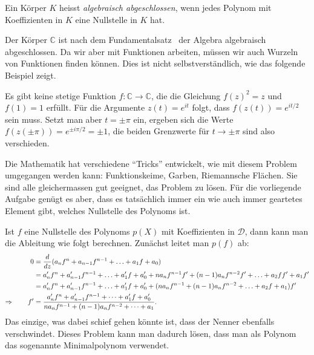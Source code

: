 \begin{definition}
\label{buch:integrale:def:algebraisch-abgeschlossen}
Ein Körper $K$ heisst {\em algebraisch abgeschlossen}, wenn jedes Polynom mit
Koeffizienten in $K$ eine Nullstelle in $K$ hat.
\end{definition}

Der Körper $\mathbb{C}$ ist nach dem
Fundamentalsatz~\label{buch:potenzen:satz:fundamentalsatz}
der Algebra algebraisch abgeschlossen.
Da wir aber mit Funktionen arbeiten, müssen wir auch Wurzeln
von Funktionen finden können.
Dies ist nicht selbstverständlich, wie das folgende Beispiel zeigt.

\begin{beispiel}
Es gibt keine stetige Funktion $f\colon \mathbb{C}\to\mathbb{C}$, die
die Gleichung $f(z)^2 = z$ und $f(1)=1$ erfüllt.
Für die Argumente $z(t)= e^{it}$ folgt, dass $f(z(t)) = e^{it/2}$ sein
muss.
Setzt man aber $t=\pm \pi$ ein, ergeben sich die Werte
$f(z(\pm\pi))=e^{\pm i\pi/2}=\pm 1$, die beiden Grenzwerte
für $t\to\pm\pi$ sind also verschieden.
\end{beispiel}

Die Mathematik hat verschiedene ``Tricks'' entwickelt, wie mit diesem
Problem umgegangen werden kann: Funktionskeime, Garben, Riemannsche
Flächen.
Sie sind alle gleichermassen gut geeignet, das Problem zu lösen.
Für die vorliegende Aufgabe genügt es aber, dass es tatsächlich
immer ein wie auch immer geartetes Element gibt, welches Nullstelle
des Polynoms ist.

Ist $f$ eine Nullstelle des Polynoms $p(X)$ mit Koeffizienten in
$\mathscr{D}$, dann kann man die Ableitung wie folgt berechnen.
Zunächst leitet man $p(f)$ ab:
\begin{align}
0&=
\frac{d}{dz}(a_nf^n + a_{n-1}f^{n-1}+\ldots+a_1f+a_0)
\notag
\\
&=
a_n'f^n + a_{n-1}'f^{n-1}+\ldots+a_1'f+a_0'
+
na_nf^{n-1}f'
+
(n-1)a_nf^{n-2}f'
+
\ldots
+
a_2ff'
+
a_1f'
\notag
\\
&=
a_n'f^n + a_{n-1}'f^{n-1}+\ldots+a_1'f+a_0'
+
(
na_nf^{n-1}
+
(n-1)a_nf^{n-2}
+
\ldots
+
a_2f
+
a_1
)f'
\notag
\\
\Rightarrow
\qquad
f'&=\frac{
a_n'f^n + a_{n-1}'f^{n-1}+\dots+a_1'f+a_0'
}{
na_nf^{n-1}
+
(n-1)a_nf^{n-2}
+
\dots
+
a_1
}.
\label{buch:integrale:eqn:algabl}
\end{align}
Das einzige, was dabei schief gehen könnte ist, dass der Nenner ebenfalls
verschwindet.
Dieses Problem kann man dadurch lösen, dass man als Polynom das
sogenannte Minimalpolynom verwendet.

